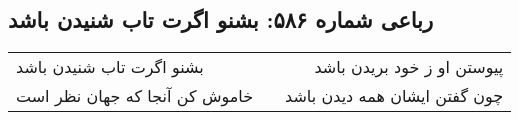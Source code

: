 \begin{center}
\section*{رباعی شماره ۵۸۶: بشنو اگرت تاب شنیدن باشد}
\label{sec:0586}
\begin{longtable}{l p{0.5cm} r}
بشنو اگرت تاب شنیدن باشد
&&
پیوستن او ز خود بریدن باشد
\\
خاموش کن آنجا که جهان نظر است
&&
چون گفتن ایشان همه دیدن باشد
\\
\end{longtable}
\end{center}
